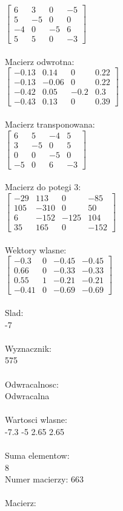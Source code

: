\documentclass[a4paper,12pt]{article}
\begin{document}
$\begin{bmatrix} 6&3&0&-5\\5&-5&0&0\\-4&0&-5&6\\5&5&0&-3 \end{bmatrix}$
\\
\\
Macierz odwrotna:\\

$\begin{bmatrix} -0.13&0.14&0&0.22\\-0.13&-0.06&0&0.22\\-0.42&0.05&-0.2&0.3\\-0.43&0.13&0&0.39 \end{bmatrix}$
\\
\\
Macierz transponowana:\\

$\begin{bmatrix} 6&5&-4&5\\3&-5&0&5\\0&0&-5&0\\-5&0&6&-3 \end{bmatrix}$
\\
\\
Macierz do potegi 3:\\

$\begin{bmatrix} -29&113&0&-85\\105&-310&0&50\\6&-152&-125&104\\35&165&0&-152 \end{bmatrix}$
\\
\\
Wektory wlasne:\\

$\begin{bmatrix} -0.3&0&-0.45&-0.45\\0.66&0&-0.33&-0.33\\0.55&1&-0.21&-0.21\\-0.41&0&-0.69&-0.69 \end{bmatrix}$
\\
\\
Slad:\\
-7
\\
\\
Wyznacznik:\\
575
\\
\\
Odwracalnosc:\\
Odwracalna
\\
\\
Wartosci wlasne:\\
-7.3 -5 2.65 2.65
\\
\\
Suma elementow:\\
8
\\
\newpage
Numer macierzy:
663
\\
\\
Macierz:\\
\end{document}
